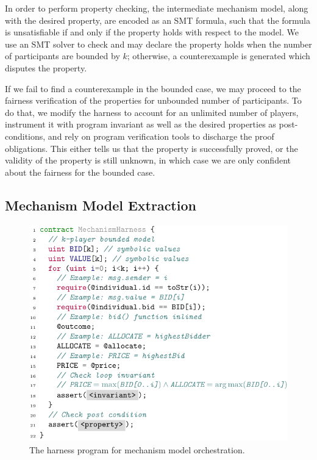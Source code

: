 In order to perform property checking, the intermediate mechanism model, along with the desired
property, are encoded as an SMT formula, such that the formula is unsatisfiable if and only if the
property holds with respect to the model.
We use an SMT solver to check and may declare the property holds when the number of participants
are bounded by $k$; otherwise, a counterexample is generated which disputes the property.

If we fail to find a counterexample in the bounded case, we may proceed to the fairness
verification of the properties for unbounded number of participants.
To do that, we modify the harness to account for an unlimited number of players, instrument it with
program invariant as well as the desired properties as post-conditions, and rely on program
verification tools to discharge the proof obligations.
This either tells us that the property is successfully proved, or the validity of the property is
still unknown, in which case we are only confident about the fairness for the bounded case.


\subsection{Mechanism Model Extraction} \label{subsec:ModelExtraction}

\begin{figure}[t]
	\centering
	\includegraphics[width=\columnwidth]{Figures/Chapter2/harness.pdf}
	\caption{The harness program for mechanism model orchestration.}\label{fig:harness}
\end{figure}

